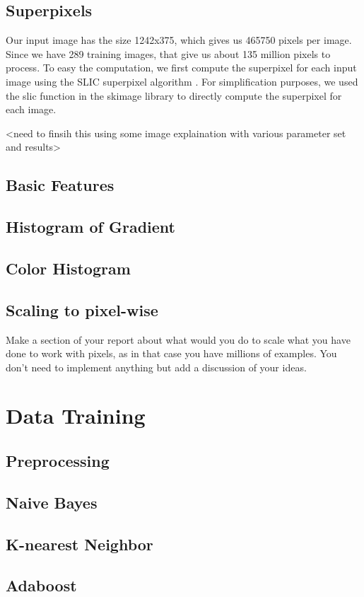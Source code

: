 \documentclass[paper=letter, fontsize=11pt]{scrartcl}
\numberwithin{equation}{section}		%
\numberwithin{figure}{section}			%
\numberwithin{table}{section}				%
\begin{document}
\subsection{Superpixels}
Our input image has the size 1242x375, which gives us 465750 pixels per image. Since we have 289 training images, that give us about 135 million pixels to process. To easy the computation, we first compute the superpixel for each input image using the SLIC superpixel algorithm \cite{bib:slic}. For simplification purposes, we used the slic function in the skimage library \cite{bib:skimage} to directly compute the superpixel for each image.

<need to finsih this using some image explaination with various parameter set and results>

\subsection{Basic Features}
\subsection{Histogram of Gradient}
\subsection{Color Histogram}
\subsection{Scaling to pixel-wise}
Make a section of your report about what would you do to scale what you have done to work with pixels, as in that case you have millions of examples. You don't need to implement anything
but add a discussion of your ideas. 

\section{Data Training}
\subsection{Preprocessing}
\subsection{Naive Bayes}
\subsection{K-nearest Neighbor}
\subsection{Adaboost}
\end{document}
